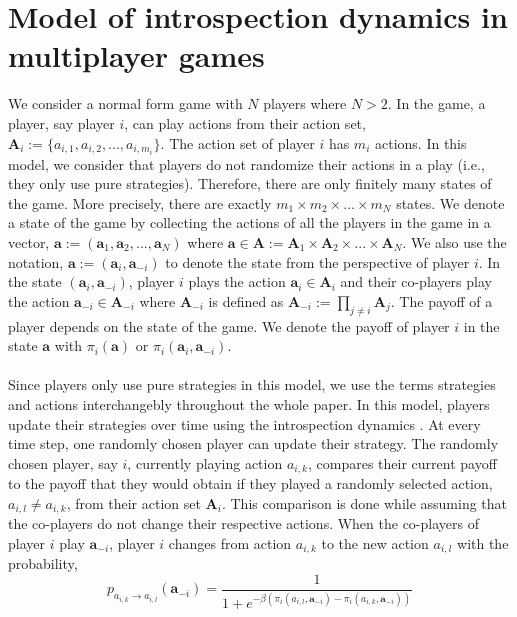 \documentclass[11pt]{article}
\theoremstyle{plainCl1}
\theoremstyle{plainCl2}
\newcommand{\A}{\mathbf{A}}
\newcommand{\abf}{\mathbf{a}}
\begin{document}
\section*{Model of introspection dynamics in multiplayer games}
We consider a normal form game with $N$ players where $N > 2$. In the game, a player, say player $i$, can play actions from their action set, $\A_i := \{a_{i,1}, a_{i,2}, ..., a_{i,m_i} \}$. The action set of player $i$ has $m_i$ actions. In this model, we consider that players do not randomize their actions in a play (i.e., they only use pure strategies). Therefore, there are only finitely many states of the game. More precisely, there are exactly $m_1 \times m_2 \times ... \times m_N$ states. We denote a state of the game by collecting the actions of all the players in the game in a vector, $\abf := (\abf_1, \abf_2, ..., \abf_N)$ where $\abf \in \A := \A_1 \times \A_2 \times ... \times \A_N$. We also use the notation, $\abf := (\abf_i, \abf_{-i})$ to denote the state from the perspective of player $i$. In the state $(\abf_i, \abf_{-i})$, player $i$ plays the action $\abf_i \in \A_i$ and their co-players play the action $\abf_{-i} \in \A_{-i}$ where $\A_{-i}$ is defined as $\A_{-i}:= \prod_{j \neq i} \A_j$. The payoff of a player depends on the state of the game. We denote the payoff of player $i$ in the state $\abf$ with $\pi_i(\abf)$ or $\pi_i(\abf_i, \abf_{-i})$. \\ \\ 
\noindent Since players only use pure strategies in this model, we use the terms strategies and actions interchangebly throughout the whole paper. In this model, players update their strategies over time using the introspection dynamics \cite{Couto:NJP:2022}. At every time step, one randomly chosen player can update their strategy. The randomly chosen player, say $i$, currently playing  action $a_{i,k}$, compares their current payoff to the payoff that they would obtain if they played a randomly selected action,  $a_{i,l} \neq a_{i,k}$, from their action set $\A_i$. This comparison is done while assuming that the co-players do not change their respective actions. When the co-players of player $i$ play $\abf_{-i}$, player $i$ changes from action $a_{i,k}$ to the new action $a_{i,l}$ with the probability, \\
\begin{equation}
 p_{a_{i,k} \to a_{i,l}} (\abf_{-i})= \frac{1}{1 + e^{\displaystyle -\beta(\pi_i(a_{i,l}, \abf_{-i}) - \pi_i(a_{i,k}, \abf_{-i}))}}
 \label{Eq:introspection-update}
\end{equation}
\end{document}
